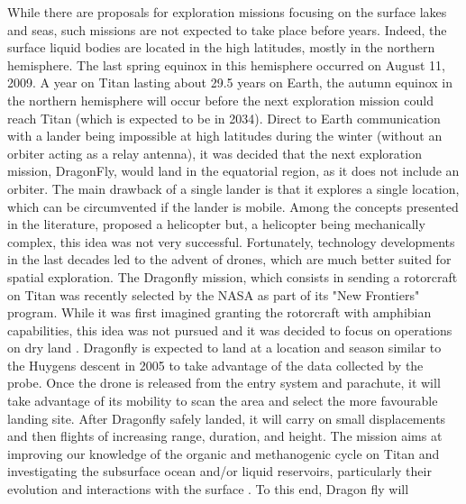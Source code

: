While there are proposals for exploration missions focusing on the surface lakes and seas, such missions are not expected to take place before years. Indeed, the surface liquid bodies are located in the high latitudes, mostly in the northern hemisphere. The last spring equinox in this hemisphere occurred on August 11, 2009. A year on Titan lasting about 29.5 years on Earth, the autumn equinox in the northern hemisphere will occur before the next exploration mission could reach Titan (which is expected to be in 2034). Direct to Earth communication with a lander being impossible at high latitudes during the winter (without an orbiter acting as a relay antenna), it was decided that the next exploration mission, DragonFly, would land in the equatorial region, as it does not include an orbiter. The main drawback of a single lander is that it explores a single location, which can be circumvented if the lander is mobile. Among the concepts presented in the literature, \cite{lorenz2000post} proposed a helicopter but, a helicopter being mechanically complex, this idea was not very successful. Fortunately, technology developments in the last decades led to the advent of drones, which are much better suited for spatial exploration. The Dragonfly mission, which consists in sending a rotorcraft on Titan was recently selected by the NASA as part of its "New Frontiers" program. While it was first imagined granting the rotorcraft with amphibian capabilities, this idea was not pursued and it was decided to focus on operations on dry land \citep{lorenz2018dragonfly}. Dragonfly is expected to land at a location and season similar to the Huygens descent in 2005 to take advantage of the data collected by the probe. Once the drone is released from the entry system and parachute, it will take advantage of its mobility to scan the area and select the more favourable landing site. After Dragonfly safely landed, it will carry on small displacements and then flights of increasing range, duration, and height. The mission aims at improving our knowledge of the organic and methanogenic cycle on Titan and investigating the subsurface ocean and/or liquid reservoirs, particularly their evolution and interactions with the surface \citep{lorenz2018dragonfly}. To this end, Dragon fly will \citep{turtle2017dragonfly}
